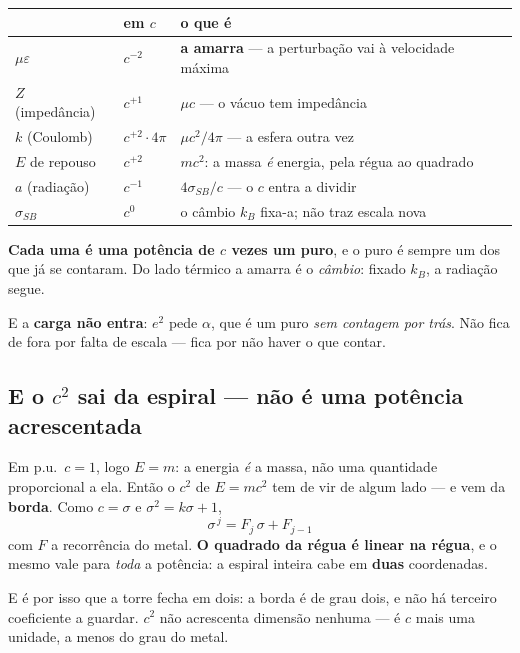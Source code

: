 \documentclass[11pt,a4paper]{article}
\begin{document}
\begin{center}\small
\setlength\tabcolsep{5pt}
\begin{tabular}{@{}lll@{}}
\toprule
 & em $c$ & o que é \\
\midrule
$\mu\varepsilon$ & $c^{-2}$ & \textbf{a amarra} --- a perturbação vai à velocidade máxima \\
$Z$ (impedância) & $c^{+1}$ & $\mu c$ --- o vácuo tem impedância \\
$k$ (Coulomb) & $c^{+2}\cdot4\pi$ & $\mu c^2/4\pi$ --- a esfera outra vez \\
$E$ de repouso & $c^{+2}$ & $mc^2$: a massa \emph{é} energia, pela régua ao quadrado \\
$a$ (radiação) & $c^{-1}$ & $4\sigma_{\!S\!B}/c$ --- o $c$ entra a dividir \\
$\sigma_{\!S\!B}$ & $c^{0}$ & o câmbio $k_B$ fixa-a; não traz escala nova \\
\bottomrule
\end{tabular}
\end{center}

\noindent \textbf{Cada uma é uma potência de $c$ vezes um puro}, e o puro é sempre um dos que já se
contaram. Do lado térmico a amarra é o \emph{câmbio}: fixado $k_B$, a radiação segue.

\smallskip
\noindent E a \textbf{carga não entra}: $e^2$ pede $\alpha$, que é um puro \emph{sem contagem por
trás}. Não fica de fora por falta de escala --- fica por não haver o que contar.

\subsection*{E o $c^2$ sai da espiral --- não é uma potência acrescentada}

Em p.u.\ $c=1$, logo \textbf{$E=m$}: a energia \emph{é} a massa, não uma quantidade proporcional a
ela. Então o $c^2$ de $E=mc^2$ tem de vir de algum lado --- e vem da \textbf{borda}. Como $c=\sigma$
e $\sigma^2=k\sigma+1$,
\[
  \boxed{\;\sigma^{\,j} = F_j\,\sigma + F_{j-1}\;}
\]
com $F$ a recorrência do metal. \textbf{O quadrado da régua é linear na régua}, e o mesmo vale para
\emph{toda} a potência: a espiral inteira cabe em \textbf{duas} coordenadas.

\smallskip
\noindent E é por isso que a torre fecha em dois: a borda é de grau dois, e não há terceiro
coeficiente a guardar. $c^2$ não acrescenta dimensão nenhuma --- é $c$ mais uma unidade, a menos do
grau do metal.
\end{document}
